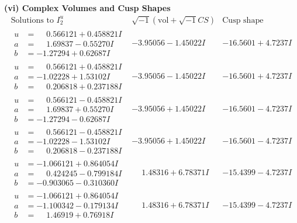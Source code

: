 \documentclass[1p]{elsarticle_modified}
\theoremstyle{definition}
\newcommand{\I}{\sqrt{-1}}
\begin{document}
\newpage\flushleft \textbf{(vi) Complex Volumes and Cusp Shapes}
$$\begin{array}{c|c|c}  
\text{Solutions to }I^u_{2}& \I (\text{vol} + \sqrt{-1}CS) & \text{Cusp shape}\\
 \hline 
\begin{aligned}
u &= \phantom{-}0.566121 + 0.458821 I \\
a &= \phantom{-}1.69837 - 0.55270 I \\
b &= -1.27294 + 0.62687 I\end{aligned}
 & -3.95056 - 1.45022 I & -16.5601 + 4.7237 I \\ \hline\begin{aligned}
u &= \phantom{-}0.566121 + 0.458821 I \\
a &= -1.02228 + 1.53102 I \\
b &= \phantom{-}0.206818 + 0.237188 I\end{aligned}
 & -3.95056 - 1.45022 I & -16.5601 + 4.7237 I \\ \hline\begin{aligned}
u &= \phantom{-}0.566121 - 0.458821 I \\
a &= \phantom{-}1.69837 + 0.55270 I \\
b &= -1.27294 - 0.62687 I\end{aligned}
 & -3.95056 + 1.45022 I & -16.5601 - 4.7237 I \\ \hline\begin{aligned}
u &= \phantom{-}0.566121 - 0.458821 I \\
a &= -1.02228 - 1.53102 I \\
b &= \phantom{-}0.206818 - 0.237188 I\end{aligned}
 & -3.95056 + 1.45022 I & -16.5601 - 4.7237 I \\ \hline\begin{aligned}
u &= -1.066121 + 0.864054 I \\
a &= \phantom{-}0.424245 - 0.799184 I \\
b &= -0.903065 - 0.310360 I\end{aligned}
 & \phantom{-}1.48316 + 6.78371 I & -15.4399 - 4.7237 I \\ \hline\begin{aligned}
u &= -1.066121 + 0.864054 I \\
a &= -1.100342 - 0.179134 I \\
b &= \phantom{-}1.46919 + 0.76918 I\end{aligned}
 & \phantom{-}1.48316 + 6.78371 I & -15.4399 - 4.7237 I \\ \hline\begin{aligned}

\end{aligned}
\end{array}$$
\end{document}
